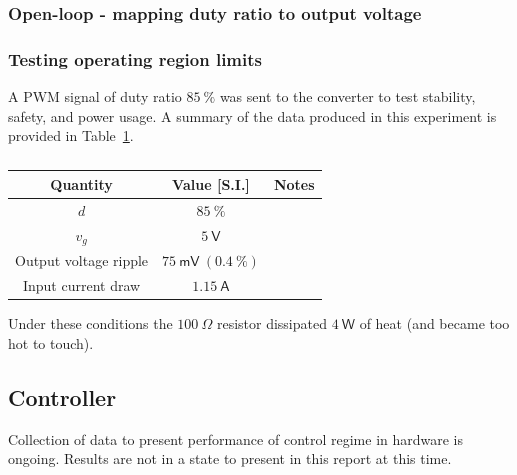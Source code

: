 \subsubsection{Open-loop - mapping duty ratio to output voltage}
\begin{figure}[H]
\centering
{}
\caption{}
\label{fig:steps}
\end{figure}
\subsubsection{Testing operating region limits}
A PWM signal of duty ratio $85 \ \mathsf{\%}$ was sent to the converter to test stability, safety, and power usage. A summary of the data produced in this experiment is provided in Table~\ref{tab:heating}.
\begin{table}[H]
    \centering
    \begin{tabular}{|c|c|c|}
    \hline
    Quantity & Value [S.I.] & Notes\\
    \hline
    $d$ & $85 \ \mathsf{\%}$ &\\
    \hline
    $v_g$ & $5 \ \mathsf{V}$ &\\
    \hline
    Output voltage ripple & $75 \ \mathsf{mV} \ (0.4 \ \mathsf{\%})$ &\\
    \hline
    Input current draw & $1.15 \ \mathsf{A}$&\\
    \hline
    \end{tabular}
    \caption{}
    \label{tab:heating}
\end{table}
Under these conditions the $100 \ \mathsf{\Omega}$ resistor dissipated $4 \ \mathsf{W}$ of heat (and became too hot to touch).
\subsection{Controller}
Collection of data to present performance of control regime in hardware is ongoing. Results are not in a state to present in this report at this time.
